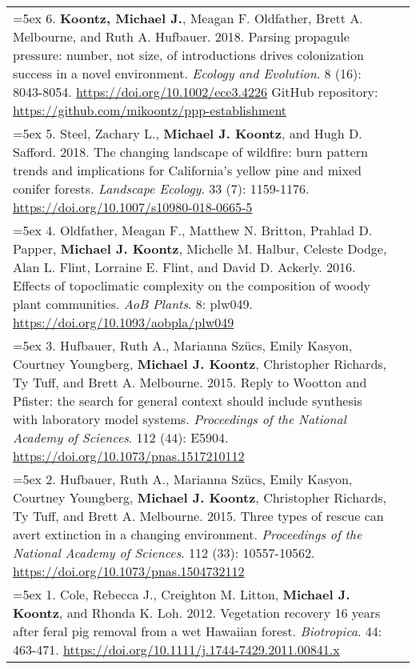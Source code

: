 \begin{longtable}{@{} >{\raggedright}p{6.10in} >{\raggedleft}X @{}}
\hangindent=5ex 6. \textbf{Koontz, Michael J.}, Meagan F. Oldfather, Brett A. Melbourne, and Ruth A. Hufbauer. 2018. Parsing propagule pressure: number, not size, of introductions drives colonization success in a novel environment. \emph{Ecology and Evolution}. 8 (16): 8043-8054. \href{https://doi.org/10.1002/ece3.4226}{https://doi.org/10.1002/ece3.4226}
\newline GitHub repository: \href{https://github.com/mikoontz/ppp-establishment}{https://github.com/mikoontz/ppp-establishment} & \tabularnewline

\hangindent=5ex 5. Steel, Zachary L., \textbf{Michael J. Koontz}, and Hugh D. Safford. 2018. The changing landscape of wildfire: burn pattern trends and implications for California's yellow pine and mixed conifer forests. \emph{Landscape Ecology}. 33 (7): 1159-1176. \href{https://doi.org/10.1007/s10980-018-0665-5}{https://doi.org/10.1007/s10980-018-0665-5} &  \tabularnewline

\hangindent=5ex 4. Oldfather, Meagan F., Matthew N. Britton, Prahlad D. Papper, \textbf{Michael J. Koontz}, Michelle M. Halbur, Celeste Dodge, Alan L. Flint, Lorraine E. Flint, and David D. Ackerly. 2016. Effects of topoclimatic complexity on the composition of woody plant communities. \emph{AoB Plants}. 8: plw049. \href{https://doi.org/10.1093/aobpla/plw049}{https://doi.org/10.1093/aobpla/plw049} & \tabularnewline

\hangindent=5ex 3. Hufbauer, Ruth A., Marianna Sz\"ucs, Emily Kasyon, Courtney Youngberg, \textbf{Michael J. Koontz}, Christopher Richards, Ty Tuff, and Brett A. Melbourne. 2015. Reply to Wootton and Pfister: the search for general context should include synthesis with laboratory model systems. \emph{Proceedings of the National Academy of Sciences}. 112 (44): E5904. \href{https://doi.org/10.1073/pnas.1517210112}{https://doi.org/10.1073/pnas.1517210112} & \tabularnewline

\hangindent=5ex 2. Hufbauer, Ruth A., Marianna Sz\"ucs, Emily Kasyon, Courtney Youngberg, \textbf{Michael J. Koontz}, Christopher Richards, Ty Tuff, and Brett A. Melbourne. 2015. Three types of rescue can avert extinction in a changing environment. \emph{Proceedings of the National Academy of Sciences}. 112 (33): 10557-10562. \href{https://doi.org/10.1073/pnas.1504732112}{https://doi.org/10.1073/pnas.1504732112} &  \tabularnewline

\hangindent=5ex 1. Cole, Rebecca J., Creighton M. Litton, \textbf{Michael J. Koontz}, and Rhonda K. Loh. 2012. Vegetation recovery 16 years after feral pig removal from a wet Hawaiian forest. \emph{Biotropica}. 44: 463-471. \href{https://doi.org/10.1111/j.1744-7429.2011.00841.x}{https://doi.org/10.1111/j.1744-7429.2011.00841.x} &  \tabularnewline

\end{longtable}